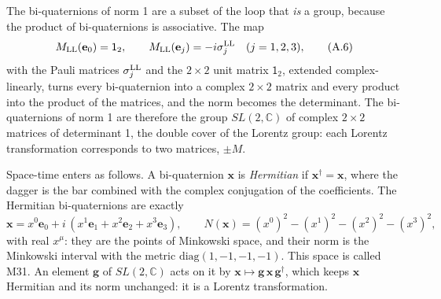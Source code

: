 \documentclass[
  10pt,
]{article}
\begin{document}
The bi-quaternions of norm 1 are a subset of the loop that \emph{is} a
group, because the product of bi-quaternions is associative. The map
\[M_{\rm LL}(\mathbf e_0)=\mathsf 1_2,\qquad M_{\rm LL}(\mathbf e_j)=-i\sigma^{\rm LL}_j\quad(j=1,2,3),\tag{A.6}\]
with the Pauli matrices \(\sigma^{\rm LL}_j\) and the \(2\times2\) unit
matrix \(\mathsf 1_2\), extended complex-linearly, turns every
bi-quaternion into a complex \(2\times2\) matrix and every product into
the product of the matrices, and the norm becomes the determinant. The
bi-quaternions of norm 1 are therefore the group \(SL(2,\mathbb C)\) of
complex \(2\times2\) matrices of determinant 1, the double cover of the
Lorentz group: each Lorentz transformation corresponds to two matrices,
\(\pm M\).

Space-time enters as follows. A bi-quaternion \(\mathbf x\) is
\emph{Hermitian} if \(\mathbf x^\dagger=\mathbf x\), where the dagger is
the bar combined with the complex conjugation of the coefficients. The
Hermitian bi-quaternions are exactly
\[\mathbf x=x^0\mathbf e_0+i\,(x^1\mathbf e_1+x^2\mathbf e_2+x^3\mathbf e_3),\qquad N(\mathbf x)=(x^0)^2-(x^1)^2-(x^2)^2-(x^3)^2,\tag{A.7}\]
with real \(x^\mu\): they are the points of Minkowski space, and their
norm is the Minkowski interval with the metric
\(\mathrm{diag}(1,-1,-1,-1)\). This space is called M31. An element
\(\mathbf g\) of \(SL(2,\mathbb C)\) acts on it by
\(\mathbf x\mapsto\mathbf g\,\mathbf x\,\mathbf g^\dagger\), which keeps
\(\mathbf x\) Hermitian and its norm unchanged: it is a Lorentz
transformation.
\end{document}
